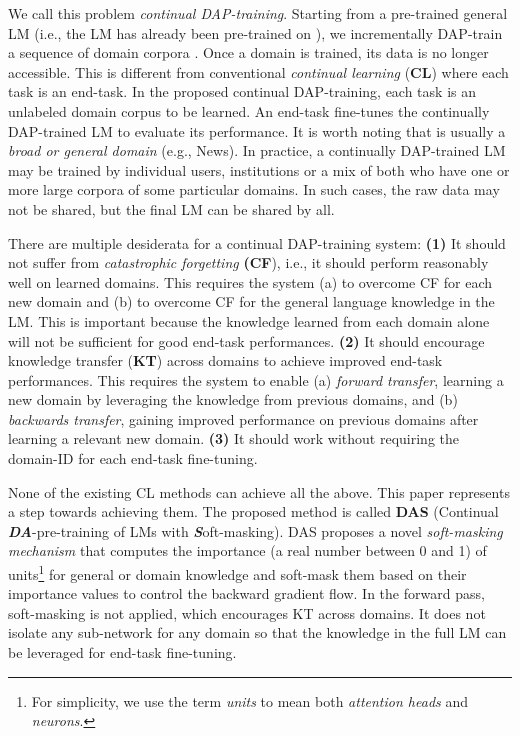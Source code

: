\documentclass{article} \usepackage{iclr2023_conference,times}
\begin{document}
{\color{black} We call this problem \textit{continual DAP-training}. 
Starting from a pre-trained general LM (i.e., the LM has already been pre-trained on ), we incrementally DAP-train a sequence of domain corpora . Once a domain is trained, its data is no longer accessible. This is different from conventional \textit{continual learning} (\textbf{CL}) where each task is an end-task. In the proposed continual DAP-training, each task is an unlabeled domain corpus to be learned. An end-task fine-tunes {\color{black}the continually DAP-trained LM to evaluate its performance}. It is worth noting that  is usually a \textit{broad or general domain} (e.g., News). In practice, a continually DAP-trained LM may be trained by individual users, institutions or a mix of both who have one or more large corpora of some particular domains. In such cases, the raw data may not be shared, but the final LM can be shared by all. 

}





There are multiple desiderata for a continual DAP-training system: 
\textbf{(1)} It should not suffer from \textit{catastrophic forgetting} \textbf{(CF}),
i.e., it should perform reasonably well on learned domains. This requires the system (a) to overcome CF for each new domain and (b) to overcome CF for the general language knowledge in the LM. This is important because 
the knowledge learned from each domain alone will not be sufficient for good end-task performances. 
\textbf{(2)} It should encourage knowledge transfer (\textbf{KT}) across domains to achieve improved end-task performances.
This requires the system to enable (a) \textit{forward transfer}, learning a new domain by leveraging the knowledge from previous domains, and (b) \textit{backwards transfer}, gaining improved performance on previous domains after learning a relevant new domain.
\textbf{(3)} It should work without requiring the domain-ID for each end-task fine-tuning.



None of the existing CL methods can achieve all the above. This paper represents a step towards achieving them. The proposed method is called \textbf{DAS} (Continual \textit{\textbf{DA}}-pre-training of LMs with \textit{\textbf{S}}oft-masking).
DAS proposes a novel \textit{soft-masking mechanism} that computes the importance (a real number between 0 and 1) of units\footnote{For simplicity, we use the term \textit{units} to mean both \textit{attention heads} and \textit{neurons}.} for general or domain knowledge and soft-mask them based on their importance values to control the backward gradient flow. In the forward pass, soft-masking is not applied, which encourages KT across domains. It does not isolate any sub-network for any domain so that the knowledge in the full LM can be leveraged for end-task fine-tuning. 
\end{document}
